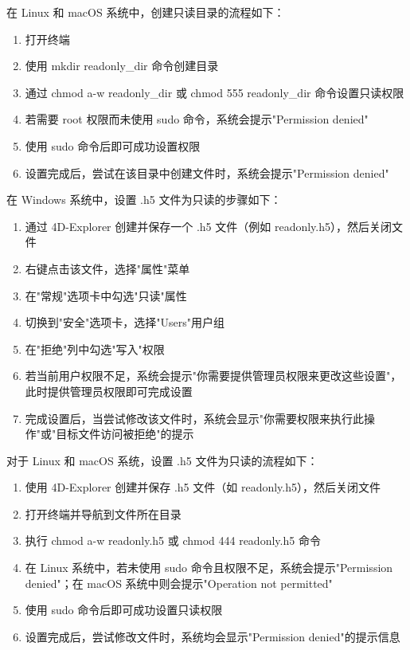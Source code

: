 \documentclass[a4paper,12pt]{report}	%
\begin{document}
在 Linux 和 macOS 系统中，创建只读目录的流程如下：
\begin{enumerate}
    \item 打开终端
    \item 使用 mkdir readonly\_dir 命令创建目录
    \item 通过 chmod a-w readonly\_dir 或 chmod 555 readonly\_dir 命令设置只读权限
    \item 若需要 root 权限而未使用 sudo 命令，系统会提示"Permission denied"
    \item 使用 sudo 命令后即可成功设置权限
    \item 设置完成后，尝试在该目录中创建文件时，系统会提示"Permission denied"
\end{enumerate}

在 Windows 系统中，设置 .h5 文件为只读的步骤如下：
\begin{enumerate}
    \item 通过 4D-Explorer 创建并保存一个 .h5 文件（例如 readonly.h5），然后关闭文件
    \item 右键点击该文件，选择"属性"菜单
    \item 在"常规"选项卡中勾选"只读"属性
    \item 切换到"安全"选项卡，选择"Users"用户组
    \item 在"拒绝"列中勾选"写入"权限
    \item 若当前用户权限不足，系统会提示"你需要提供管理员权限来更改这些设置"，此时提供管理员权限即可完成设置
    \item 完成设置后，当尝试修改该文件时，系统会显示"你需要权限来执行此操作"或"目标文件访问被拒绝"的提示
\end{enumerate}

对于 Linux 和 macOS 系统，设置 .h5 文件为只读的流程如下：
\begin{enumerate}
    \item 使用 4D-Explorer 创建并保存 .h5 文件（如 readonly.h5），然后关闭文件
    \item 打开终端并导航到文件所在目录
    \item 执行 chmod a-w readonly.h5 或 chmod 444 readonly.h5 命令
    \item 在 Linux 系统中，若未使用 sudo 命令且权限不足，系统会提示"Permission denied"；在 macOS 系统中则会提示"Operation not permitted"
    \item 使用 sudo 命令后即可成功设置只读权限
    \item 设置完成后，尝试修改文件时，系统均会显示"Permission denied"的提示信息
\end{enumerate}
\end{document}
